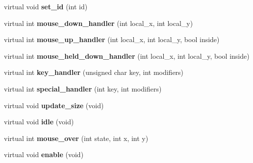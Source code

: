 \begin{DoxyCompactItemize}
\item 
\hypertarget{classGLUI__Control_ad27f17ac45b13fb12d623f269d76db14}{virtual void {\bfseries set\-\_\-id} (int id)}\label{classGLUI__Control_ad27f17ac45b13fb12d623f269d76db14}

\item 
\hypertarget{classGLUI__Control_a92b77565168a1d2003bca1c16ac00e8d}{virtual int {\bfseries mouse\-\_\-down\-\_\-handler} (int local\-\_\-x, int local\-\_\-y)}\label{classGLUI__Control_a92b77565168a1d2003bca1c16ac00e8d}

\item 
\hypertarget{classGLUI__Control_ac32aad8f69134d03682e34d0488a18f1}{virtual int {\bfseries mouse\-\_\-up\-\_\-handler} (int local\-\_\-x, int local\-\_\-y, bool inside)}\label{classGLUI__Control_ac32aad8f69134d03682e34d0488a18f1}

\item 
\hypertarget{classGLUI__Control_a4b44e44c1c455adc7f98c63aeb6aa919}{virtual int {\bfseries mouse\-\_\-held\-\_\-down\-\_\-handler} (int local\-\_\-x, int local\-\_\-y, bool inside)}\label{classGLUI__Control_a4b44e44c1c455adc7f98c63aeb6aa919}

\item 
\hypertarget{classGLUI__Control_a7f9da8ca7df99bd4cf394a9fd8ce19f1}{virtual int {\bfseries key\-\_\-handler} (unsigned char key, int modifiers)}\label{classGLUI__Control_a7f9da8ca7df99bd4cf394a9fd8ce19f1}

\item 
\hypertarget{classGLUI__Control_ab08da363df3f3eae867dd5ae61200f23}{virtual int {\bfseries special\-\_\-handler} (int key, int modifiers)}\label{classGLUI__Control_ab08da363df3f3eae867dd5ae61200f23}

\item 
\hypertarget{classGLUI__Control_a4bfe55acbbf735a7d2ff07d687a481e2}{virtual void {\bfseries update\-\_\-size} (void)}\label{classGLUI__Control_a4bfe55acbbf735a7d2ff07d687a481e2}

\item 
\hypertarget{classGLUI__Control_a4eb47a3c2c20c0c24dca192a2eb96c8d}{virtual void {\bfseries idle} (void)}\label{classGLUI__Control_a4eb47a3c2c20c0c24dca192a2eb96c8d}

\item 
\hypertarget{classGLUI__Control_ac16c3ff7bef1a64abd36a00aa3d935d8}{virtual int {\bfseries mouse\-\_\-over} (int state, int x, int y)}\label{classGLUI__Control_ac16c3ff7bef1a64abd36a00aa3d935d8}

\item 
\hypertarget{classGLUI__Control_a574856beba946e72e0aea31ace96d94a}{virtual void {\bfseries enable} (void)}\label{classGLUI__Control_a574856beba946e72e0aea31ace96d94a}


\end{DoxyCompactItemize}
